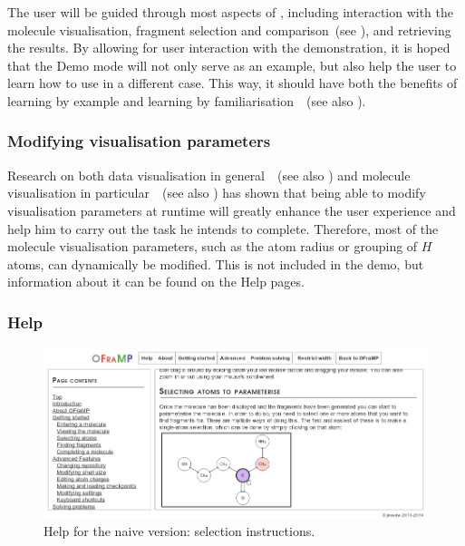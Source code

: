 The user will be guided through most aspects of \oframp, including interaction with the molecule visualisation, fragment selection and comparison~(see ), and retrieving the results. By allowing for user interaction with the demonstration, it is hoped that the Demo mode will not only serve as an example, but also help the user to learn how to use \oframp{} in a different case. This way, it should have both the benefits of learning by example and learning by familiarisation~\cite{sweller1994cognitive}~(see also ).

\subsubsection{Modifying visualisation parameters}
Research on both data visualisation in general~\cite{gallopoulos1994computer}~(see also ) and molecule visualisation in particular~\cite{aksela2008computer,taylor2013interface}~(see also ) has shown that being able to modify visualisation parameters at runtime will greatly enhance the user experience and help him to carry out the task he intends to complete. Therefore, most of the molecule visualisation parameters, such as the atom radius or grouping of $H$ atoms, can dynamically be modified. %
This is not included in the demo, but information about it can be found on the \oframp{} Help pages.

\subsubsection{Help}

\begin{figure}
\center
\includegraphics[width=.9\textwidth]{img/help.png}
\caption{\oframp{} Help for the naive version: selection instructions.}
\end{figure}

